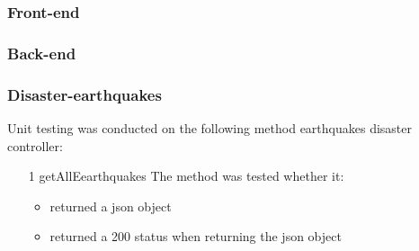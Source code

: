 \subsubsection{Front-end}



\subsubsection{Back-end}
\subsubsection{Disaster-earthquakes}

Unit testing was conducted on the following method earthquakes disaster controller:
\begin{enumerate}
	\item[1]getAllEearthquakes
	The method was tested whether it:
	\begin{itemize}
		\item returned a json object
		\item returned a 200 status when returning the json object
	\end{itemize}
	
\end{enumerate}